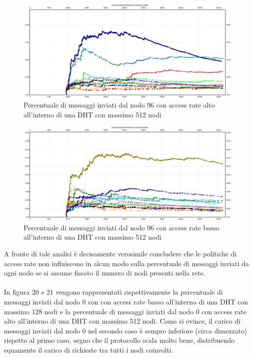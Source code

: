 \documentclass[	
	DIV=calc,
	paper=a4,
	fontsize=11pt,
	onecolumn
]{scrartcl} %
\begin{document}
	\begin{figure}[H]
		\centering
		\includegraphics[scale=0.35]	{SymphonyDHT/plots/PercentageOfMessagesSent/512_Nodes_FastAccess/SymphonyDHT_512Nodes_FastAccess_Node96.png}
		\caption{Percentuale di messaggi inviati dal nodo 96 con access rate alto all'interno di una DHT con massimo 512 nodi}
		\label{Figura 18}
	\end{figure}
	\begin{figure}[H]
		\centering
		\includegraphics[scale=0.35]	{SymphonyDHT/plots/PercentageOfMessagesSent/512_Nodes_SlowAccess/SymphonyDHT_512Nodes_SlowAccess_Node96.png}
		\caption{Percentuale di messaggi inviati dal nodo 96 con access rate basso all'interno di una DHT con massimo 512 nodi}
		\label{Figura 19}
	\end{figure}		
	
	A fronte di tale analisi è decisamente verosimile concludere che le politiche di access rate non influiscono in alcun modo sulla percentuale di messaggi inviati da ogni nodo se si assume fissato il numero di nodi presenti nella rete.\\\\
	
	In figura 20 e 21 vengono rappresentati rispettivamente la percentuale di messaggi inviati dal nodo 0 con con access rate basso all'interno di una DHT con massimo 128 nodi e la percentuale di messaggi inviati dal nodo 0 con access rate alto all'interno di una DHT con massimo 512 nodi. Come si evince, il carico di messaggi inviati dal nodo 0 nel secondo caso è sempre inferiore (circa dimezzato) rispetto al primo caso, segno che il protocollo scala molto bene, distribuendo equamente il carico di richieste tra tutti i nodi coinvolti.
	
\end{document}
